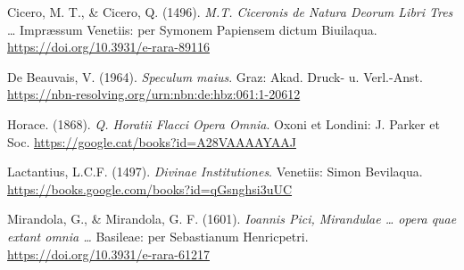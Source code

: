 \documentclass[
]{article}
\begin{document}
Cicero, M. T., \& Cicero, Q. (1496). \emph{M.T. Ciceronis de Natura
Deorum Libri Tres} \ldots{} Impræssum Venetiis: per Symonem Papiensem
dictum Biuilaqua. \url{https://doi.org/10.3931/e-rara-89116}

De Beauvais, V. (1964). \emph{Speculum maius}. Graz: Akad. Druck- u.
Verl.-Anst. \url{https://nbn-resolving.org/urn:nbn:de:hbz:061:1-20612}

Horace. (1868). \emph{Q. Horatii Flacci Opera Omnia}. Oxoni et Londini:
J. Parker et Soc. \url{https://google.cat/books?id=A28VAAAAYAAJ}

Lactantius, L.C.F. (1497). \emph{Divinae Institutiones}. Venetiis: Simon
Bevilaqua. \url{https://books.google.com/books?id=qGsnghsi3uUC}

Mirandola, G., \& Mirandola, G. F. (1601). \emph{Ioannis Pici,
Mirandulae \ldots{} opera quae extant omnia \ldots{}} Basileae: per
Sebastianum Henricpetri. \url{https://doi.org/10.3931/e-rara-61217}
\end{document}
